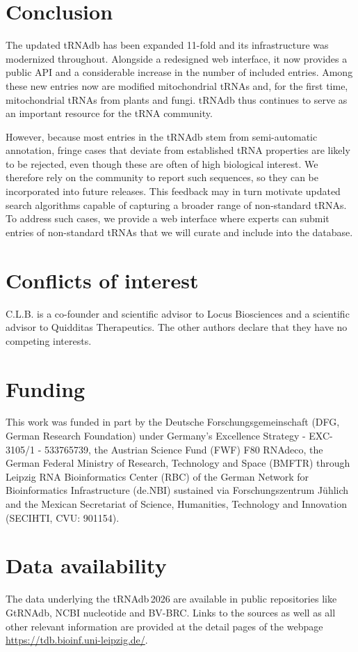 \documentclass[unnumsec,webpdf,contemporary,large]{oup-authoring-template}
\newcommand{\TODO}[1]{\begingroup\color{red}#1\endgroup}
\begin{document}
\section{Conclusion}

The updated tRNAdb has been expanded 11-fold and its infrastructure was
modernized throughout.  Alongside a redesigned web interface, it now
provides a public API and a considerable increase in the number of included
entries. Among these new entries now are modified mitochondrial tRNAs and,
for the first time, mitochondrial tRNAs from plants and fungi. tRNAdb thus
continues to serve as an important resource for the tRNA community.

However, because most entries in the tRNAdb stem from semi-automatic
annotation, fringe cases that deviate from established tRNA properties are
likely to be rejected, even though these are often of high biological
interest. We therefore rely on the community to report such sequences, so
they can be incorporated into future releases. This feedback may in turn
motivate updated search algorithms capable of capturing a broader range of
non-standard tRNAs.  To address such cases, we provide a web interface
where experts can submit entries of non-standard tRNAs that we will curate
and include into the database. 

\section{Conflicts of interest}
C.L.B. is a co-founder and scientific advisor to Locus Biosciences and a
scientific advisor to Quidditas Therapeutics. The other authors declare
that they have no competing interests.

\section{Funding}
This work was funded in part by the Deutsche Forschungsgemeinschaft (DFG,
German Research Foundation) under Germany's Excellence Strategy -
EXC-3105/1 - 533765739, the Austrian Science Fund (FWF) F80 RNAdeco, the
German Federal Ministry of Research, Technology and Space (BMFTR) through
Leipzig RNA Bioinformatics Center (RBC) of the German Network for
Bioinformatics Infrastructure (de.NBI) sustained via Forschungszent\-rum
J\"{u}hlich \TODO{and the Mexican Secretariat of Science, Humanities, Technology and Innovation (SECIHTI, CVU: 901154).}

\section{Data availability}
The data underlying the tRNAdb\,2026 are available in public repositories
like GtRNAdb, NCBI nucleotide and BV-BRC. Links to the sources as well as
all other relevant information are provided at the detail pages of the
webpage \url{https://tdb.bioinf.uni-leipzig.de/}.
\end{document}

